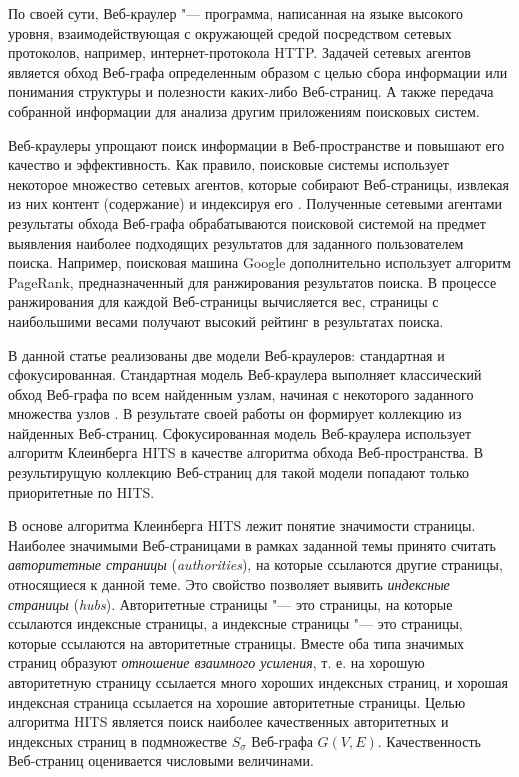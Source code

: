 По своей сути, Веб-краулер "--- программа, написанная на языке высокого уровня, взаимодействующая с окружающей средой посредством сетевых протоколов, например, интернет-протокола HTTP. Задачей сетевых агентов является обход Веб-графа определенным образом с целью сбора информации или понимания структуры и полезности каких-либо Веб-страниц. А также передача собранной информации для анализа другим приложениям поисковых систем.

Веб-краулеры упрощают поиск информации в Веб-пространстве и повышают его качество и эффективность. Как правило, поисковые системы использует некоторое множество сетевых агентов, которые собирают Веб-страницы, извлекая из них контент (содержание) и индексируя его \cite{ManningRaghavanSchutze}. Полученные сетевыми агентами результаты обхода Веб-графа обрабатываются поисковой системой на предмет выявления наиболее подходящих результатов для заданного пользователем поиска. Например, поисковая машина Google дополнительно использует алгоритм PageRank, предназначенный для ранжирования результатов поиска. В процессе ранжирования для каждой Веб-страницы вычисляется вес, страницы с наибольшими весами получают высокий рейтинг в результатах поиска.

В данной статье реализованы две модели Веб-краулеров: стандартная и сфокусированная. Стандартная модель Веб-краулера выполняет классический обход Веб-графа по всем найденным узлам, начиная с некоторого заданного множества узлов \cite{ArasuChoGM}. В результате своей работы он формирует коллекцию из найденных Веб-страниц. Сфокусированная модель Веб-краулера использует алгоритм Клеинберга HITS в качестве алгоритма обхода Веб-пространства. В результирущую коллекцию Веб-страниц для такой модели попадают только приоритетные по HITS.

В основе алгоритма Клеинберга HITS лежит понятие значимости страницы. Наиболее значимыми Веб-страницами в рамках заданной темы принято считать \textit{авторитетные страницы} (\textit{authorities}), на которые ссылаются другие страницы, относящиеся к данной теме. Это свойство позволяет выявить \textit{индексные страницы} (\textit{hubs}). Авторитетные страницы "--- это страницы, на которые ссылаются индексные страницы, а индексные страницы "--- это страницы, которые ссылаются на авторитетные страницы. Вместе оба типа значимых страниц образуют \textit{отношение взаимного усиления}, т. е. на хорошую авторитетную страницу ссылается много хороших индексных страниц, и хорошая индексная страница ссылается на хорошие авторитетные страницы. Целью алгоритма HITS является поиск наиболее качественных авторитетных и индексных страниц в подмножестве \(S_\sigma\) Веб-графа \(G(V, E)\). Качественность Веб-страниц оценивается числовыми величинами.

